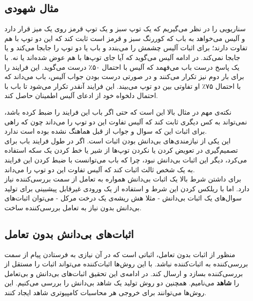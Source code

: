\subsection{مثال شهودی}
سناریویی را در نظر می‌گیریم که یک توپ سبز و یک توپ قرمز روی یک میز قرار دارد و آلیس می‌خواهد به باب که کوررنگ سبز و قرمز است ثابت کند که این دو توپ با هم تفاوت دارند؛ برای اثبات آلیس چشمش را می‌بندد و باب یا دو توپ را جابجا می‌کند و یا جابجا نمی‌کند. در ادامه آلیس می‌گوید که آیا جای توپ‌ها با هم عوض شده‌اند یا نه. با یک پاسخ درست باب می‌فهمد که آلیس با احتمال ۵۰٪ درست می‌گوید. این فرایند را برای بار دوم نیز تکرار می‌کنند و در صورتی درست بودن جواب آلیس، باب می‌داند که با احتمال ۷۵٪ او تفاوتی بین دو توپ می‌بیند. این فرایند آنقدر تکرار می‌شود تا باب با احتمال دلخواه خود از ادعای آلیس اطمینان حاصل کند.
\par
نکته‌ی مهم در مثال بالا این است که حتی اگر باب این فرایند را ضبط کرده باشد، نمی‌تواند به کس دیگری ثابت کند که آلیس تفاوت این دو توپ را می‌داند چون که راهی برای اثبات این که سوال و جواب از قبل هماهنگ نشده بوده است ندارد. 
\\
این یکی از نیازمندی‌های بی‌دانش بودن اثبات است. اگر در طول فرایند باب برای تصمیم‌گیری در تعویض کردن یا نکردن توپ‌ها از شیر یا خط کردن یک سکه استفاده می‌کرد، دیگر این اثبات بی‌دانش نبود، چرا که باب می‌توانست با ضبط کردن این فرایند به یک شخص ثالث اثبات کند که آلیس تفاوت این دو توپ را می‌داند. 
\\
برای داشتن شرط بالا یک اثبات بی‌دانش همواره به تعامل از سمت بررسی‌کننده نیاز دارد. اما با ریلکس کردن این شرط و استفاده از یک ورودی غیرقابل پیشبینی برای تولید سوال‌های یک اثبات بی‌دانش - مثلا هش ریشه‌ی یک درخت مرکل - می‌توان اثبات‌های بی‌دانش بدون نیاز به تعامل بررسی‌کننده ساخت. 


\subsection{اثبات‌های بی‌دانش بدون تعامل} 
منظور از اثبات بدون تعامل، اثباتی‌ است که در آن نیازی به فرستادن پیام از سمت بررسی‌کننده به اثبات‌کننده نباشد. با این روش‌ها اثبات‌کننده می‌تواند اثبات را مستقل از بررسی‌کننده بسازد و ارسال کند. در ادامه‌ی این تحقیق اثبات‌های بی‌دانش و بی‌تعامل را 
\textbf{شاهد}
می‌نامیم. همچنین دو روش تولید یک شاهد بی‌دانش را بررسی می‌کنیم. این روش‌ها می‌توانند برای خروجی هر محاسبات کامپیوتری شاهد ایجاد کنند. 

